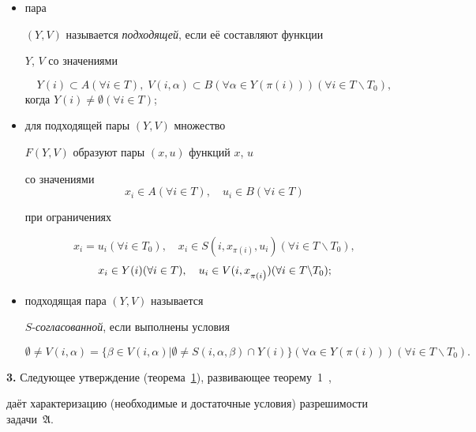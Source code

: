 \begin{itemize}

\item[--]

пара

$(Y,V)$ называется {\sl подходящей}, если её составляют функции

$Y$, $V$ со значениями 

$$Y(i)\subset A(\forall i\in T), \;  V(i,\alpha )\subset B(\forall \alpha \in Y(\pi (i))) (\forall i\in

T\backslash T_0),$$ когда $Y(i)\ne \emptyset (\forall i\in

T)$; 

\item[--]

для подходящей пары $(Y,V)$ множество

$F(Y,V)$ образуют пары $(x,u)$ функций $x$, $u$

со значениями $$x_i \in A(\forall i\in T),\quad u_i \in B(\forall

i\in T)$$ 

при ограничениях 

$$x_i =u_i (\forall i\in T_0 ), \quad x_i \in

S(i,x_{\pi(i)},u_i )(\forall i\in T\backslash T_0

),$$ $$x_i \in Y(i)(\forall i\in T),\quad u_i

\in V(i,x_{\pi(i\mbox)})(\forall i\in T\backslash T_0

);$$ 

\item[--]

подходящая пара $(Y,V)$ называется

$S$-{\sl согласованной}, если выполнены условия 

$$\emptyset \ne V(i,\alpha )=\{\beta \in

V(i,\alpha )\vert \emptyset \ne S(i,\alpha ,\beta )\cap Y(i)\} (\forall

\alpha \in Y(\pi (i))) (\forall i\in T\backslash T_0).$$



\end{itemize}



\smallskip



{\bf 3.} Следующее утверждение (теорема~\hyperlink{ovch:th1}{1}), развивающее теорему~1~\cite{ovchinnikov:bib2},

даёт характеризацию (необходимые и достаточные условия) разрешимости задачи~\hyperlink{ovch:zadmm}{$\mathfrak{A}$}.



